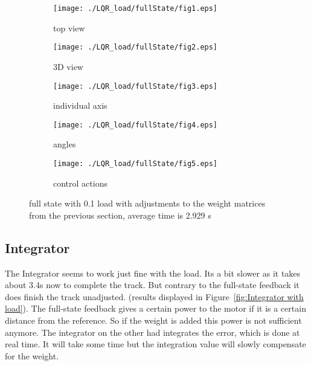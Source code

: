 \begin{figure}[H]
	\centering
	\begin{subfigure}[b]{0.3\textwidth}
		\texttt{[image: ./LQR\_load/fullState/fig1.eps]}
		\caption{top view}
	\end{subfigure}
	\begin{subfigure}[b]{0.3\textwidth}
		\texttt{[image: ./LQR\_load/fullState/fig2.eps]}
		\caption{3D view}
		\label{fig: full state , strong enough }
	\end{subfigure}
	\begin{subfigure}[b]{0.3\textwidth}
		\texttt{[image: ./LQR\_load/fullState/fig3.eps]}
		\caption{individual axis}
	\end{subfigure}
	\begin{subfigure}[b]{0.3\textwidth}
		\texttt{[image: ./LQR\_load/fullState/fig4.eps]}
		\caption{angles}
	\end{subfigure}
	\begin{subfigure}[b]{0.3\textwidth}
		\texttt{[image: ./LQR\_load/fullState/fig5.eps]}
		\caption{control actions}
	\end{subfigure}
	\caption{full state with 0.1 load with adjustments to the weight matrices from the previous section, average time is 2.929 s }\label{fig:full state with load}
\end{figure}

\subsection{Integrator}
The Integrator seems to work just fine with the load. Its a bit slower as it takes about 3.4s now to complete the track. But contrary to the full-state feedback it does finish the track unadjusted. (results displayed in Figure~\ref{fig:Integrator with load}). The full-state feedback gives a certain power to the motor if it is a certain distance from the reference. So if the weight is added this power is not sufficient anymore. The integrator on the other had integrates the error, which is done at real time. It will take some time but the integration value will slowly compensate for the weight.

